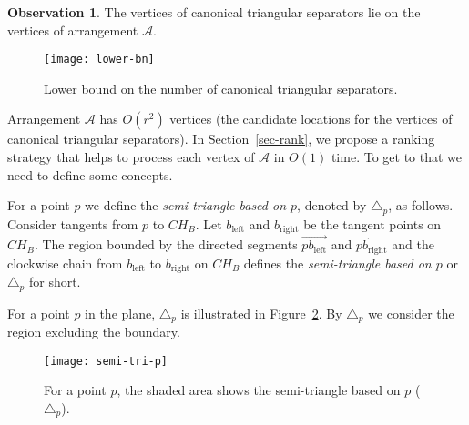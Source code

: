 \documentclass[a4paper,UKenglish]{lipics-v2018}
\theoremstyle{definition}
\newtheorem{observation}[theorem]{Observation}
\begin{document}
\begin{observation}
The vertices of canonical triangular separators lie on the vertices of arrangement $\mathcal A$.
\end{observation}

\begin{figure}[h]
\centering
\texttt{[image: lower-bn]}
\caption{Lower bound on the number of canonical triangular separators. }
\label{lower-bn}
\end{figure}

Arrangement $\mathcal A$ has $O(r^2)$ vertices (the candidate locations for the vertices of canonical triangular separators). In Section~\ref{sec-rank}, we propose a ranking strategy that helps  to process each vertex of $\mathcal A$ in $O(1)$ time. To get to that we need to define some concepts.

\begin{definition}
For a point $p$ we define the \emph{semi-triangle based on $p$}, denoted by $\triangle_p$, as follows. Consider tangents from $p$ to $CH_B$. Let $b_{\mathrm{left}}$ and $b_{\mathrm{right}}$ be the tangent points on $CH_B$. The region bounded by the directed segments $\overrightarrow{p b_{\mathrm{left}}}$ and $\overleftarrow{p b_{\mathrm{right}}}$ and the clockwise chain from $b_{\mathrm{left}}$ to $b_{\mathrm{right}}$ on $CH_B$ defines the \emph{semi-triangle based on $p$} or $\triangle_p$ for short.
\end{definition}

For a point $p$ in the plane, $\triangle_p$ is illustrated in Figure~\ref{semi-tri-p}. By $\triangle_p$ we consider the region excluding the boundary.
\begin{figure}[h]
\centering
\texttt{[image: semi-tri-p]}
\caption{For a point $p$, the shaded area shows  the semi-triangle based on $p$ ($\triangle_p$). }
\label{semi-tri-p}
\end{figure}
\end{document}
